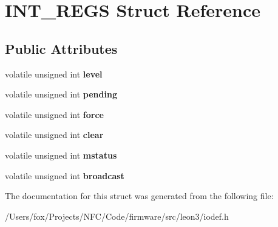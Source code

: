 \hypertarget{struct_i_n_t___r_e_g_s}{
\section{INT\_\-REGS Struct Reference}
\label{struct_i_n_t___r_e_g_s}
}
\subsection*{Public Attributes}
\begin{DoxyCompactItemize}
\item 
\hypertarget{struct_i_n_t___r_e_g_s_aff82824848ce6f15ecbe6b074aa38f2f}{
volatile unsigned int {\bfseries level}}
\label{struct_i_n_t___r_e_g_s_aff82824848ce6f15ecbe6b074aa38f2f}

\item 
\hypertarget{struct_i_n_t___r_e_g_s_ad6b71c23aaad5a8634eee437fa764c87}{
volatile unsigned int {\bfseries pending}}
\label{struct_i_n_t___r_e_g_s_ad6b71c23aaad5a8634eee437fa764c87}

\item 
\hypertarget{struct_i_n_t___r_e_g_s_a34054085c4ba80594f71ef3155b4e840}{
volatile unsigned int {\bfseries force}}
\label{struct_i_n_t___r_e_g_s_a34054085c4ba80594f71ef3155b4e840}

\item 
\hypertarget{struct_i_n_t___r_e_g_s_a97d3aad07044bc91384dc37de7f11af6}{
volatile unsigned int {\bfseries clear}}
\label{struct_i_n_t___r_e_g_s_a97d3aad07044bc91384dc37de7f11af6}

\item 
\hypertarget{struct_i_n_t___r_e_g_s_abb55ac24dd31b35801ae215258d78700}{
volatile unsigned int {\bfseries mstatus}}
\label{struct_i_n_t___r_e_g_s_abb55ac24dd31b35801ae215258d78700}

\item 
\hypertarget{struct_i_n_t___r_e_g_s_aab078ac4fd530c116c295f0b821132de}{
volatile unsigned int {\bfseries broadcast}}
\label{struct_i_n_t___r_e_g_s_aab078ac4fd530c116c295f0b821132de}

\end{DoxyCompactItemize}


The documentation for this struct was generated from the following file:\begin{DoxyCompactItemize}
\item 
/Users/fox/Projects/NFC/Code/firmware/src/leon3/iodef.h\end{DoxyCompactItemize}

